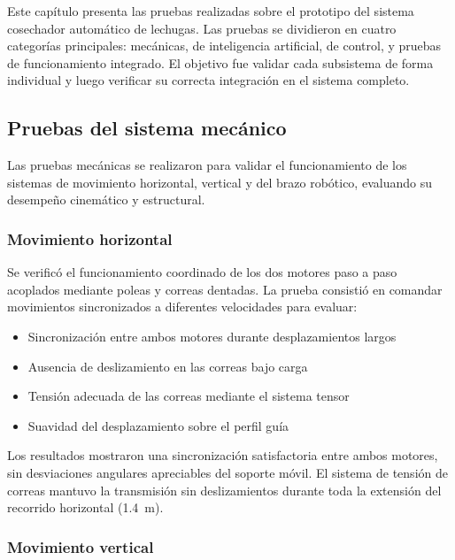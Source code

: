 
Este capítulo presenta las pruebas realizadas sobre el prototipo del sistema cosechador automático de lechugas. Las pruebas se dividieron en cuatro categorías principales: mecánicas, de inteligencia artificial, de control, y pruebas de funcionamiento integrado. El objetivo fue validar cada subsistema de forma individual y luego verificar su correcta integración en el sistema completo.

\subsection{Pruebas del sistema mecánico}

Las pruebas mecánicas se realizaron para validar el funcionamiento de los sistemas de movimiento horizontal, vertical y del brazo robótico, evaluando su desempeño cinemático y estructural.

\subsubsection{Movimiento horizontal}

Se verificó el funcionamiento coordinado de los dos motores paso a paso acoplados mediante poleas y correas dentadas. La prueba consistió en comandar movimientos sincronizados a diferentes velocidades para evaluar:

\begin{itemize}[label=$\bullet$]
    \item Sincronización entre ambos motores durante desplazamientos largos
    \item Ausencia de deslizamiento en las correas bajo carga
    \item Tensión adecuada de las correas mediante el sistema tensor
    \item Suavidad del desplazamiento sobre el perfil guía
\end{itemize}

Los resultados mostraron una sincronización satisfactoria entre ambos motores, sin desviaciones angulares apreciables del soporte móvil. El sistema de tensión de correas mantuvo la transmisión sin deslizamientos durante toda la extensión del recorrido horizontal (1.4~m).

\subsubsection{Movimiento vertical}

